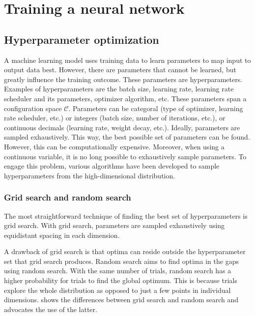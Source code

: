 
\chapter{Training a neural network}


\section{Hyperparameter optimization}\label{sec:hparam}

A machine learning model uses training data to learn parameters to map input to output data best.
However, there are parameters that cannot be learned, but greatly influence the training outcome.
These parameters are hyperparameters.
Examples of hyperparameters are the batch size, learning rate, learning rate scheduler and its parameters, optimizer algorithm, etc.
These parameters span a configuration space $\mathcal{C}$.
Parameters can be categoral (type of optimizer, learning rate scheduler, etc.) or integers (batch size, number of iterations, etc.), or continuous decimals (learning rate, weight decay, etc.).
Ideally, parameters are sampled exhaustively.
This way, the best possible set of parameters can be found.
However, this can be computationally expensive.
Moreover, when using a continuous variable, it is no long possible to exhaustively sample parameters.
To engage this problem, various algorithms have been developed to sample hyperparameters from the high-dimensional distribution.

\subsection{Grid search and random search}
The most straightforward technique of finding the best set of hyperparameters is grid search.
With grid search, parameters are sampled exhaustively using equidistant spacing in each dimension.

A drawback of grid search is that optima can reside outside the hyperparameter set that grid search produces.
Random search \cite{Bergstra2012} aims to find optima in the gaps using random search.
With the same number of trials, random search has a higher probability for trials to find the global optimum.
This is because trials explore the whole distribution as opposed to just a few points in individual dimensions.
 shows the differences between grid search and random search and advocates the use of the latter.

